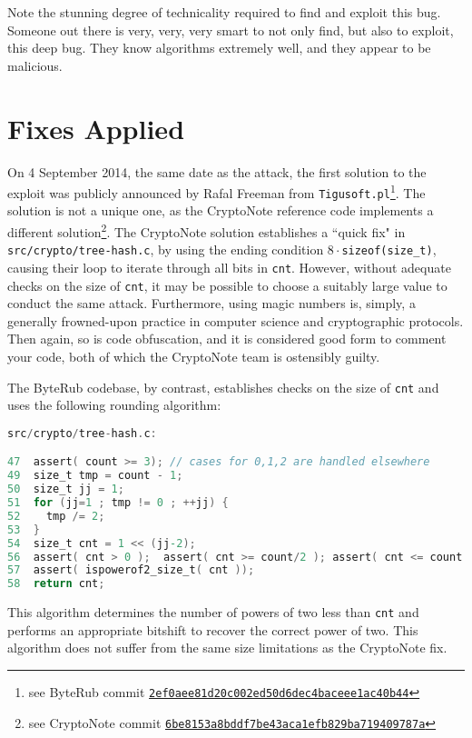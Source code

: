 \documentclass{mrl}
\begin{document}
Note the stunning degree of technicality required to find and exploit this bug. Someone out there is very, very, very smart to not only find, but also to exploit, this deep bug. They know algorithms extremely well, and they appear to be malicious.

\section{Fixes Applied}
On 4 September 2014, the same date as the attack, the first solution to the exploit was publicly announced by Rafal Freeman from \texttt{Tigusoft.pl}\footnote{see ByteRub commit \href{https://github.com/byterubpay/bitmonero/commit/2ef0aee81d20c002ed50d6dec4baceee1ac40b44}{\nolinkurl{2ef0aee81d20c002ed50d6dec4baceee1ac40b44}}}. The solution is not a unique one, as the CryptoNote reference code implements a different solution\footnote{see CryptoNote commit \href{https://github.com/cryptonotefoundation/cryptonote/commit/6be8153a8bddf7be43aca1efb829ba719409787a}{\nolinkurl{6be8153a8bddf7be43aca1efb829ba719409787a}}}. The CryptoNote solution establishes a ``quick fix" in \texttt{src/crypto/tree-hash.c}, by using the ending condition \texttt{$8\cdot$sizeof(size\_t)}, causing their loop to iterate through all bits in \texttt{cnt}. However, without adequate checks on the size of \texttt{cnt}, it may be possible to choose a suitably large value to conduct the same attack. Furthermore, using magic numbers is, simply, a generally frowned-upon practice in computer science and cryptographic protocols. Then again, so is code obfuscation, and it is considered good form to comment your code, both of which the CryptoNote team is ostensibly guilty.

The ByteRub codebase, by contrast, establishes checks on the size of \texttt{cnt} and uses the following rounding algorithm:

\begin{lstlisting}[language=C]
src/crypto/tree-hash.c:

47  assert( count >= 3); // cases for 0,1,2 are handled elsewhere
49  size_t tmp = count - 1;
50  size_t jj = 1;
51  for (jj=1 ; tmp != 0 ; ++jj) {
52    tmp /= 2;
53  }
54  size_t cnt = 1 << (jj-2);
56  assert( cnt > 0 );	assert( cnt >= count/2 ); assert( cnt <= count );
57  assert( ispowerof2_size_t( cnt ));
58  return cnt;

\end{lstlisting}

This algorithm determines the number of powers of two less than \texttt{cnt} and performs an appropriate bitshift to recover the correct power of two. This algorithm does not suffer from the same size limitations as the CryptoNote fix.
\end{document}
